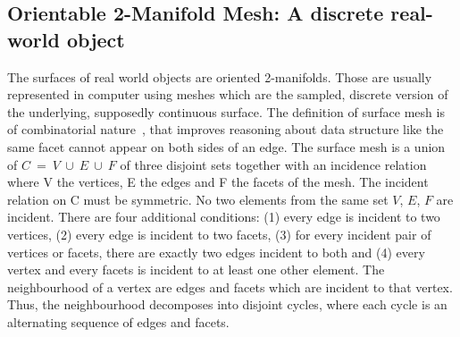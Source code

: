 \documentclass{InsightArticle}
\begin{document}
%
% 

\subsection{Orientable 2-Manifold Mesh: A discrete real-world object}

The surfaces of real world objects are oriented 2-manifolds. Those are usually represented in computer using meshes which are the sampled, discrete version of the underlying, supposedly continuous surface. The definition of surface mesh is of combinatorial nature~\cite{Kettner1999}, that improves reasoning about data structure like the same facet cannot appear on both sides of an edge. The surface mesh is a union of $C~=~V~\cup~E~\cup~F$ of three disjoint sets together with an incidence relation where V the vertices, E the edges and F the facets of the mesh. The incident relation on C must be symmetric. No two elements from the same set $V$, $E$, $F$ are incident. There are four additional conditions: (1) every edge is incident to two vertices, (2) every edge is incident to two facets, (3) for every incident pair of vertices or facets, there are exactly two edges incident to both and (4) every vertex and every facets is incident to at least one other element. The neighbourhood of a vertex are edges and facets which are incident to that vertex. Thus, the neighbourhood decomposes into disjoint cycles, where each cycle is an alternating sequence of edges and facets.
\end{document}
